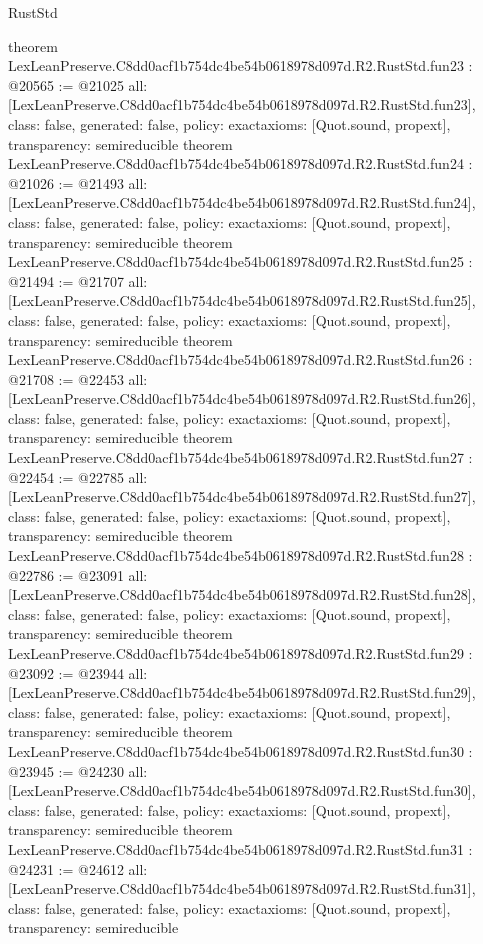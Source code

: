 \begin{lexlean}{RustStd}
\begin{coremodule}
{}
theorem LexLeanPreserve.C8dd0acf1b754dc4be54b0618978d097d.R2.RustStd.fun23 : @20565 := @21025 {
  all: [LexLeanPreserve.C8dd0acf1b754dc4be54b0618978d097d.R2.RustStd.fun23],
  class: false,
  generated: false,
  policy: exact{axioms: [Quot.sound, propext]},
  transparency: semireducible
}
theorem LexLeanPreserve.C8dd0acf1b754dc4be54b0618978d097d.R2.RustStd.fun24 : @21026 := @21493 {
  all: [LexLeanPreserve.C8dd0acf1b754dc4be54b0618978d097d.R2.RustStd.fun24],
  class: false,
  generated: false,
  policy: exact{axioms: [Quot.sound, propext]},
  transparency: semireducible
}
theorem LexLeanPreserve.C8dd0acf1b754dc4be54b0618978d097d.R2.RustStd.fun25 : @21494 := @21707 {
  all: [LexLeanPreserve.C8dd0acf1b754dc4be54b0618978d097d.R2.RustStd.fun25],
  class: false,
  generated: false,
  policy: exact{axioms: [Quot.sound, propext]},
  transparency: semireducible
}
theorem LexLeanPreserve.C8dd0acf1b754dc4be54b0618978d097d.R2.RustStd.fun26 : @21708 := @22453 {
  all: [LexLeanPreserve.C8dd0acf1b754dc4be54b0618978d097d.R2.RustStd.fun26],
  class: false,
  generated: false,
  policy: exact{axioms: [Quot.sound, propext]},
  transparency: semireducible
}
theorem LexLeanPreserve.C8dd0acf1b754dc4be54b0618978d097d.R2.RustStd.fun27 : @22454 := @22785 {
  all: [LexLeanPreserve.C8dd0acf1b754dc4be54b0618978d097d.R2.RustStd.fun27],
  class: false,
  generated: false,
  policy: exact{axioms: [Quot.sound, propext]},
  transparency: semireducible
}
theorem LexLeanPreserve.C8dd0acf1b754dc4be54b0618978d097d.R2.RustStd.fun28 : @22786 := @23091 {
  all: [LexLeanPreserve.C8dd0acf1b754dc4be54b0618978d097d.R2.RustStd.fun28],
  class: false,
  generated: false,
  policy: exact{axioms: [Quot.sound, propext]},
  transparency: semireducible
}
theorem LexLeanPreserve.C8dd0acf1b754dc4be54b0618978d097d.R2.RustStd.fun29 : @23092 := @23944 {
  all: [LexLeanPreserve.C8dd0acf1b754dc4be54b0618978d097d.R2.RustStd.fun29],
  class: false,
  generated: false,
  policy: exact{axioms: [Quot.sound, propext]},
  transparency: semireducible
}
theorem LexLeanPreserve.C8dd0acf1b754dc4be54b0618978d097d.R2.RustStd.fun30 : @23945 := @24230 {
  all: [LexLeanPreserve.C8dd0acf1b754dc4be54b0618978d097d.R2.RustStd.fun30],
  class: false,
  generated: false,
  policy: exact{axioms: [Quot.sound, propext]},
  transparency: semireducible
}
theorem LexLeanPreserve.C8dd0acf1b754dc4be54b0618978d097d.R2.RustStd.fun31 : @24231 := @24612 {
  all: [LexLeanPreserve.C8dd0acf1b754dc4be54b0618978d097d.R2.RustStd.fun31],
  class: false,
  generated: false,
  policy: exact{axioms: [Quot.sound, propext]},
  transparency: semireducible
}
\end{coremodule}
\end{lexlean}
